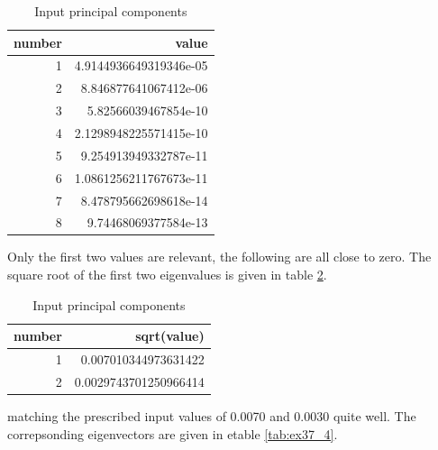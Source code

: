 \begin{table}[hbt]
\begin{center}
\begin{tabular}{r|r}
number & value                  \\
\hline
1      & 4.9144936649319346e-05 \\
2      & 8.846877641067412e-06  \\
3      & 5.82566039467854e-10   \\
4      & 2.1298948225571415e-10 \\
5      & 9.254913949332787e-11  \\
6      & 1.0861256211767673e-11 \\
7      & 8.478795662698618e-14  \\
8      & 9.74468069377584e-13   \\
\end{tabular}
\caption{Input principal components}
\label{tab:ex37_2}
\end{center}
\end{table}

Only the first two values are relevant, the following are all close to zero. The square root of the first two
eigenvalues is given in table \ref{tab:ex37_3}.

\begin{table}[hbt]
\begin{center}
\begin{tabular}{r|r}
number & sqrt(value)                \\
\hline
1      & 0.007010344973631422       \\
2      & 0.0029743701250966414      \\
\end{tabular}
\caption{Input principal components}
\label{tab:ex37_3}
\end{center}
\end{table}

matching the prescribed input values of 0.0070 and 0.0030 quite well. The correpsonding eigenvectors are given in etable
\ref{tab:ex37_4}.


